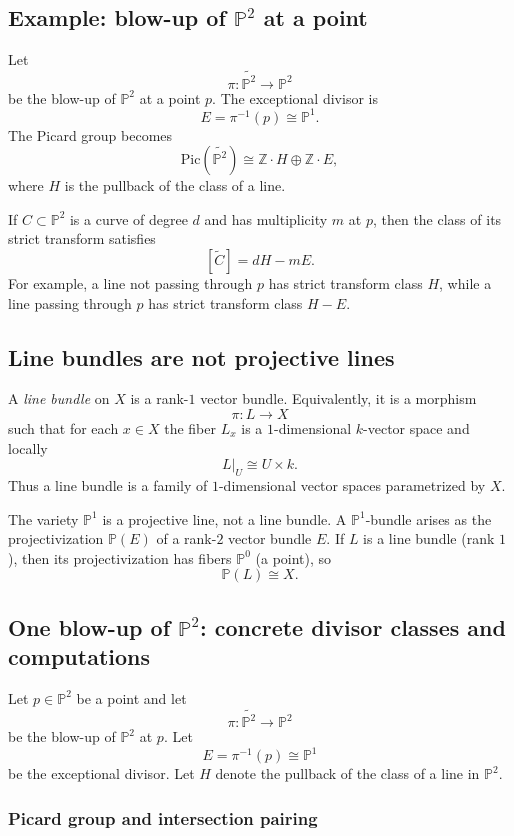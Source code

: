 \documentclass[12pt,a4paper]{article}
\theoremstyle{plain}
\theoremstyle{definition}      %
\begin{document}
\subsection*{Example: blow-up of $\mathbb P^2$ at a point}

Let
\[
\pi:\widetilde{\mathbb P^2}\to \mathbb P^2
\]
be the blow-up of $\mathbb P^2$ at a point $p$.
The exceptional divisor is
\[
E=\pi^{-1}(p)\cong \mathbb P^1.
\]
The Picard group becomes
\[
\mathrm{Pic}(\widetilde{\mathbb P^2})\cong \mathbb Z\cdot H \oplus \mathbb Z\cdot E,
\]
where $H$ is the pullback of the class of a line.

If $C\subset \mathbb P^2$ is a curve of degree $d$ and has multiplicity $m$ at $p$, then the class of its strict transform satisfies
\[
[\widetilde C]=dH-mE.
\]
For example, a line not passing through $p$ has strict transform class $H$, while a line passing through $p$ has strict transform class $H-E$.

\subsection*{Line bundles are not projective lines}

A \emph{line bundle} on $X$ is a rank-$1$ vector bundle.
Equivalently, it is a morphism
\[
\pi:L\to X
\]
such that for each $x\in X$ the fiber $L_x$ is a $1$-dimensional $k$-vector space and locally
\[
L|_{U}\cong U\times k.
\]
Thus a line bundle is a family of $1$-dimensional vector spaces parametrized by $X$.

The variety $\mathbb P^1$ is a projective line, not a line bundle.
A $\mathbb P^1$-bundle arises as the projectivization $\mathbb P(E)$ of a rank-$2$ vector bundle $E$.
If $L$ is a line bundle (rank $1$), then its projectivization has fibers $\mathbb P^0$ (a point), so
\[
\mathbb P(L)\cong X.
\]

\subsection*{One blow-up of $\mathbb P^2$: concrete divisor classes and computations}

Let $p\in \mathbb P^2$ be a point and let
\[
\pi:\widetilde{\mathbb P^2}\to \mathbb P^2
\]
be the blow-up of $\mathbb P^2$ at $p$.
Let
\[
E=\pi^{-1}(p)\cong \mathbb P^1
\]
be the exceptional divisor.
Let $H$ denote the pullback of the class of a line in $\mathbb P^2$.

\subsubsection*{Picard group and intersection pairing}
\end{document}
